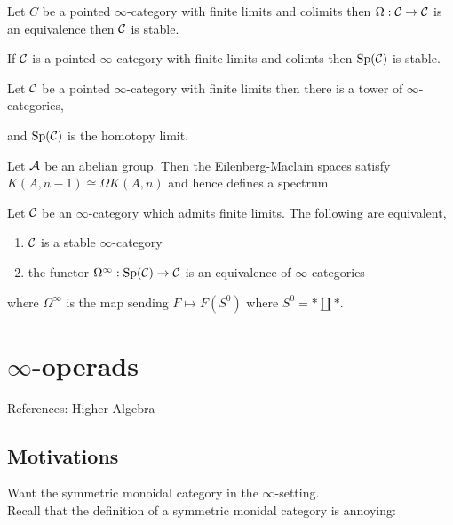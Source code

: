 \documentclass[12pt]{article}
\begin{document}
\begin{prop}[1.4.2.11]
Let $C$ be a pointed $\infty$-category with finite limits and colimits then $\Omega : \mathcal{C} \to \mathcal{C}$ is an equivalence then $\mathcal{C}$ is stable. 
\end{prop}

\begin{prop}
If $\mathcal{C}$ is a pointed $\infty$-category with finite limits and colimts then $\mathrm{Sp}(\mathcal{C})$ is stable. 
\end{prop}

\begin{prop}
Let $\mathcal{C}$ be a pointed $\infty$-category with finite limits then there is a tower of $\infty$-categories,
\begin{center}
\end{center}
and $\mathrm{Sp}(\mathcal{C})$ is the homotopy limit. 
\end{prop}

Let $\mathcal{A}$ be an abelian group. Then the Eilenberg-Maclain spaces satisfy $K(A, n-1) \cong \Omega K(A, n)$ and hence defines a spectrum. 

\begin{prop}
Let $\mathcal{C}$ be an $\infty$-category which admits finite limits. The following are equivalent,
\begin{enumerate}
\item $\mathcal{C}$ is a stable $\infty$-category
\item the functor $\Omega^\infty : \mathrm{Sp}(\mathcal{C}) \to \mathcal{C}$ is an equivalence of $\infty$-categories
\end{enumerate}
where $\Omega^\infty$ is the map sending $F \mapsto F(S^0)$ where $S^0 = * \coprod *$.
\end{prop}

\section{$\infty$-operads}

References: Higher Algebra

\subsection{Motivations}

Want the symmetric monoidal category in the $\infty$-setting. 
\bigskip\\
Recall that the definition of a symmetric monidal category is annoying:
\end{document}
